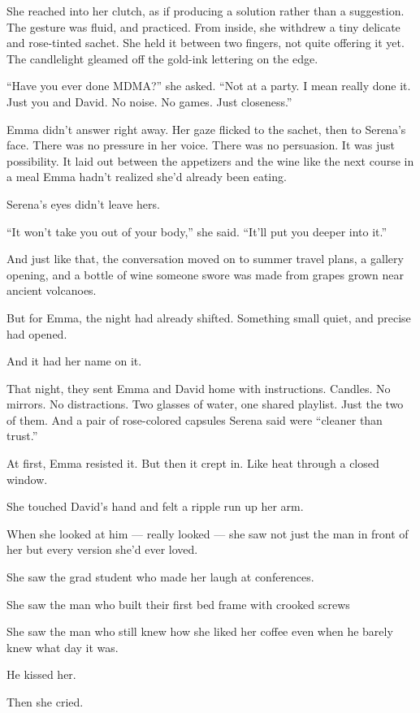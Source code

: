 She reached into her clutch, as if producing a solution rather than a suggestion. The gesture was fluid, and  
practiced. From inside, she withdrew a tiny delicate and rose-tinted sachet. She held it between two fingers, 
not quite offering it yet. The candlelight gleamed off the gold-ink lettering on the edge.

``Have you ever done MDMA?'' she asked. ``Not at a party. I mean really done it. Just you and David. No noise. 
No games. Just closeness.''

Emma didn’t answer right away. Her gaze flicked to the sachet, then to Serena’s face. There was no pressure in 
her voice. There was no persuasion. It was just possibility. It laid out between the appetizers and the wine 
like the next course in a meal Emma hadn’t realized she’d already been eating.

Serena’s eyes didn’t leave hers.

``It won’t take you out of your body,'' she said. ``It’ll put you deeper into it.''

And just like that, the conversation moved on to summer travel plans, a gallery opening, and a bottle of wine 
someone swore was made from grapes grown near ancient volcanoes.

But for Emma, the night had already shifted. Something small quiet, and precise had opened. 

And it had her name on it.

That night, they sent Emma and David home with instructions. Candles. No mirrors. No 
distractions. Two glasses of water, one shared playlist. Just the two of them. And a pair 
of rose-colored capsules Serena said were “cleaner than trust.”

At first, Emma resisted it. But then it crept in. Like heat through 
a closed window.

She touched David’s hand and felt a ripple run up her arm. 

When she looked at him --- really looked --- she saw not just the man in front of her but every 
version she’d ever loved.

She saw the grad student who made her laugh at conferences.

She saw the man who built their first bed frame with crooked screws

She saw the man who still knew how she liked her coffee even when he barely knew what day it was.

He kissed her.

Then she cried.

